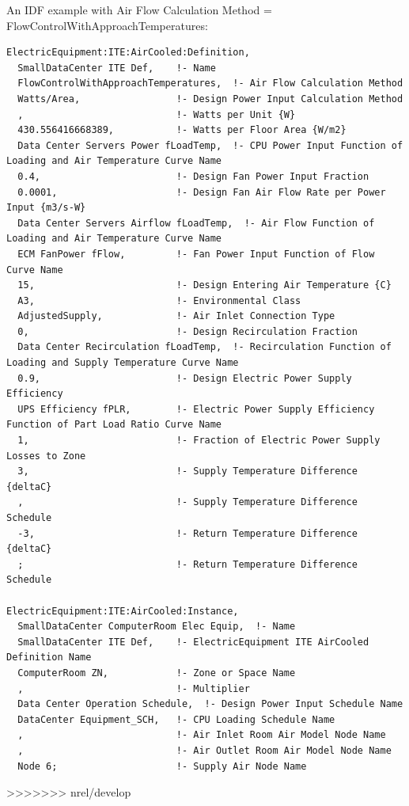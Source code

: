 An IDF example with Air Flow Calculation Method = FlowControlWithApproachTemperatures:

\begin{lstlisting}
ElectricEquipment:ITE:AirCooled:Definition,
  SmallDataCenter ITE Def,    !- Name
  FlowControlWithApproachTemperatures,  !- Air Flow Calculation Method
  Watts/Area,                 !- Design Power Input Calculation Method
  ,                           !- Watts per Unit {W}
  430.556416668389,           !- Watts per Floor Area {W/m2}
  Data Center Servers Power fLoadTemp,  !- CPU Power Input Function of Loading and Air Temperature Curve Name
  0.4,                        !- Design Fan Power Input Fraction
  0.0001,                     !- Design Fan Air Flow Rate per Power Input {m3/s-W}
  Data Center Servers Airflow fLoadTemp,  !- Air Flow Function of Loading and Air Temperature Curve Name
  ECM FanPower fFlow,         !- Fan Power Input Function of Flow Curve Name
  15,                         !- Design Entering Air Temperature {C}
  A3,                         !- Environmental Class
  AdjustedSupply,             !- Air Inlet Connection Type
  0,                          !- Design Recirculation Fraction
  Data Center Recirculation fLoadTemp,  !- Recirculation Function of Loading and Supply Temperature Curve Name
  0.9,                        !- Design Electric Power Supply Efficiency
  UPS Efficiency fPLR,        !- Electric Power Supply Efficiency Function of Part Load Ratio Curve Name
  1,                          !- Fraction of Electric Power Supply Losses to Zone
  3,                          !- Supply Temperature Difference {deltaC}
  ,                           !- Supply Temperature Difference Schedule
  -3,                         !- Return Temperature Difference {deltaC}
  ;                           !- Return Temperature Difference Schedule

ElectricEquipment:ITE:AirCooled:Instance,
  SmallDataCenter ComputerRoom Elec Equip,  !- Name
  SmallDataCenter ITE Def,    !- ElectricEquipment ITE AirCooled Definition Name
  ComputerRoom ZN,            !- Zone or Space Name
  ,                           !- Multiplier
  Data Center Operation Schedule,  !- Design Power Input Schedule Name
  DataCenter Equipment_SCH,   !- CPU Loading Schedule Name
  ,                           !- Air Inlet Room Air Model Node Name
  ,                           !- Air Outlet Room Air Model Node Name
  Node 6;                     !- Supply Air Node Name
\end{lstlisting}

>>>>>>> nrel/develop
